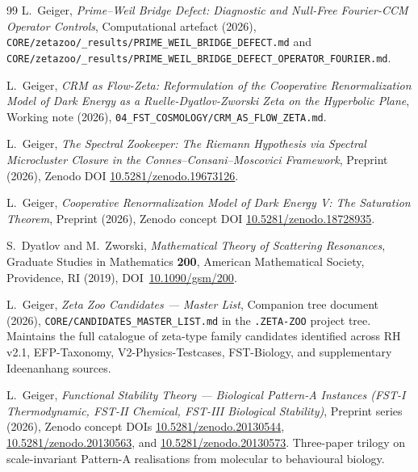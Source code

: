 \documentclass[11pt]{article}
\theoremstyle{definition}
\theoremstyle{remark}
\begin{document}
\begin{thebibliography}{99}
L.~Geiger, \emph{Prime--Weil Bridge Defect: Diagnostic and
Null-Free Fourier-CCM Operator Controls}, Computational artefact
(2026),
\texttt{CORE/zetazoo/\_results/PRIME\_WEIL\_BRIDGE\_DEFECT.md} and
\texttt{CORE/zetazoo/\_results/PRIME\_WEIL\_BRIDGE\_DEFECT\_OPERATOR\_FOURIER.md}.

L.~Geiger, \emph{CRM as Flow-Zeta: Reformulation of the Cooperative
Renormalization Model of Dark Energy as a Ruelle-Dyatlov-Zworski
Zeta on the Hyperbolic Plane}, Working note (2026),
\texttt{04\_FST\_COSMOLOGY/CRM\_AS\_FLOW\_ZETA.md}.

L.~Geiger, \emph{The Spectral Zookeeper: The Riemann Hypothesis via
Spectral Microcluster Closure in the Connes--Consani--Moscovici
Framework}, Preprint (2026), Zenodo DOI
\href{https://doi.org/10.5281/zenodo.19673126}{10.5281/zenodo.19673126}.

L.~Geiger, \emph{Cooperative Renormalization Model of Dark Energy V:
The Saturation Theorem}, Preprint (2026), Zenodo concept DOI
\href{https://doi.org/10.5281/zenodo.18728935}{10.5281/zenodo.18728935}.

S.~Dyatlov and M.~Zworski, \emph{Mathematical Theory of Scattering
Resonances}, Graduate Studies in Mathematics \textbf{200}, American
Mathematical Society, Providence, RI (2019),
DOI~\href{https://doi.org/10.1090/gsm/200}{10.1090/gsm/200}.

L.~Geiger, \emph{Zeta Zoo Candidates --- Master List}, Companion
tree document (2026),
\texttt{CORE/CANDIDATES\_MASTER\_LIST.md} in the
\texttt{.ZETA-ZOO} project tree. Maintains the full
catalogue of zeta-type family candidates identified across RH
v2.1, EFP-Taxonomy, V2-Physics-Testcases, FST-Biology, and
supplementary Ideenanhang sources.

L.~Geiger, \emph{Functional Stability Theory --- Biological
Pattern-A Instances (FST-I Thermodynamic, FST-II Chemical, FST-III
Biological Stability)}, Preprint series (2026),
Zenodo concept DOIs
\href{https://doi.org/10.5281/zenodo.20130544}{10.5281/zenodo.20130544},
\href{https://doi.org/10.5281/zenodo.20130563}{10.5281/zenodo.20130563},
and \href{https://doi.org/10.5281/zenodo.20130573}{10.5281/zenodo.20130573}.
Three-paper trilogy on scale-invariant Pattern-A realisations from
molecular to behavioural biology.



\end{thebibliography}
\end{document}
